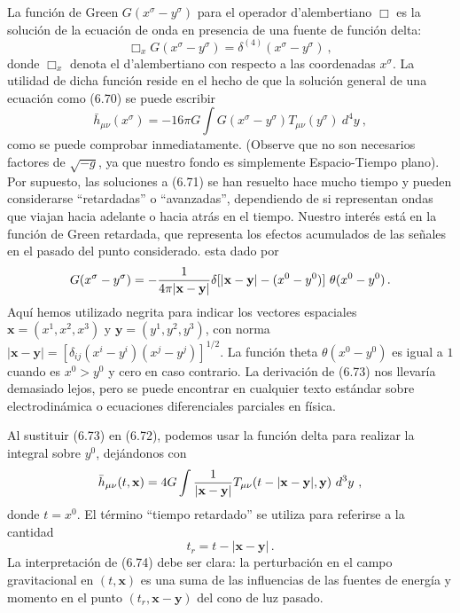 \documentclass[11pt,b5paper,openany,twoside]{book}
\newcommand{\mn}{{\mu\nu}}
\def\g{{\sqrt{-g}}}
\def\bh{{\bar h}}
\def\x{\mathbf{x}}
\def\y{\mathbf{y}}
\begin{document}
La función de Green $G(x^\sigma - y^\sigma)$ para el operador d'alembertiano $\Box$ es la solución de la ecuación de onda en presencia de una fuente de función delta:
\begin{equation}
{\Box}_x G(x^\sigma - y^\sigma) = \delta^{(4)}(x^\sigma - y^\sigma)
\ ,\label{6.71}
\end{equation}
donde ${\Box}_x$ denota el d'alembertiano con respecto a las coordenadas $x^\sigma$.
La utilidad de dicha función reside en el hecho de que la solución general de una ecuación como (6.70) se puede escribir
\begin{equation}
\bh_\mn(x^\sigma) = -16\pi G \int G(x^\sigma - y^\sigma)T_\mn(y^\sigma)
~d^4y\ ,\label{6.72}
\end{equation}
como se puede comprobar inmediatamente.
(Observe que no son necesarios factores de $\g$, ya que nuestro fondo es simplemente Espacio-Tiempo plano).
Por supuesto, las soluciones a (6.71) se han resuelto hace mucho tiempo y pueden considerarse ``retardadas'' o ``avanzadas'', dependiendo de si representan ondas que viajan hacia adelante o hacia atrás en el tiempo.
Nuestro interés está en la función de Green retardada, que representa los efectos acumulados de las señales en el pasado del punto considerado.
esta dado por
\begin{equation}
G(x^\sigma - y^\sigma) = -{{1}\over{4\pi |\x-\y |}}\delta
[|\x-\y | - (x^0-y^0)] ~\theta(x^0-y^0)\,.\label{6.73}
\end{equation}
Aquí hemos utilizado negrita para indicar los vectores espaciales $\x = (x^1,x^2,x^3)$ y $\y=(y^1,y^2,y^3)$, con norma $|\x-\y |=[\delta_{ij}(x^i-y^i)(x^j-y^j)]^{1/2}$.
La función theta $\theta(x^0-y^0)$ es igual a $1$ cuando es $x^0> y^0$ y cero en caso contrario.
La derivación de (6.73) nos llevaría demasiado lejos, pero se puede encontrar en cualquier texto estándar sobre electrodinámica o ecuaciones diferenciales parciales en física.

Al sustituir (6.73) en (6.72), podemos usar la función delta para realizar la integral sobre $y^0$, dejándonos con
\begin{equation}
\bh_\mn(t,\x) =4G\int {{1}\over {|\x-\y |}}T_\mn(t-|\x-\y |,\y)
~d^3y\ ,\label{6.74}
\end{equation}
donde $t=x^0$.
El término ``tiempo retardado'' se utiliza para referirse a la cantidad
\begin{equation}
t_r = t-|\x-\y |\,.\label{6.75}
\end{equation}
La interpretación de (6.74) debe ser clara: la perturbación en el campo gravitacional en $(t,\x)$ es una suma de las influencias de las fuentes de energía y momento en el punto $(t_r,\x-\y)$ del cono de luz pasado.
\end{document}
